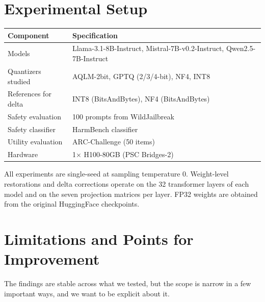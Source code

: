 \documentclass[11pt]{article}
\begin{document}
\section{Experimental Setup}
\label{sec:setup}

\begin{center}
\small
\begin{tabular}{ll}
\toprule
\textbf{Component} & \textbf{Specification} \\
\midrule
Models & Llama-3.1-8B-Instruct, Mistral-7B-v0.2-Instruct, Qwen2.5-7B-Instruct \\
Quantizers studied & AQLM-2bit, GPTQ (2/3/4-bit), NF4, INT8 \\
References for delta & INT8 (BitsAndBytes), NF4 (BitsAndBytes) \\
Safety evaluation & 100 prompts from WildJailbreak~\cite{jiang2024wildjailbreak} \\
Safety classifier & HarmBench classifier~\cite{mazeika2024harmbench} \\
Utility evaluation & ARC-Challenge (50 items)~\cite{clark2018arc} \\
Hardware & 1$\times$ H100-80GB (PSC Bridges-2) \\
\bottomrule
\end{tabular}
\end{center}

All experiments are single-seed at sampling temperature 0. Weight-level restorations and delta corrections operate on the 32 transformer layers of each model and on the seven projection matrices per layer. FP32 weights are obtained from the original HuggingFace checkpoints.

\section{Limitations and Points for Improvement}
\label{sec:limitations}

The findings are stable across what we tested, but the scope is narrow in a few important ways, and we want to be explicit about it.
\end{document}
